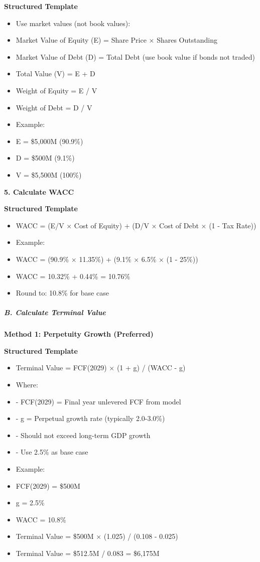 \documentclass[11pt]{article}
\begin{document}
\textbf{Structured Template}
\begin{itemize}[leftmargin=*,itemsep=2pt,topsep=2pt]
\item {} Use market values (not book values):
\item {} Market Value of Equity (E) = Share Price × Shares Outstanding
\item {} Market Value of Debt (D) = Total Debt (use book value if bonds not traded)
\item {} Total Value (V) = E + D
\item {} Weight of Equity = E / V
\item {} Weight of Debt = D / V
\item {} Example:
\item {} E = \$5,000M (90.9\%)
\item {} D = \$500M (9.1\%)
\item {} V = \$5,500M (100\%)
\end{itemize}

\textbf{5. Calculate WACC}

\textbf{Structured Template}
\begin{itemize}[leftmargin=*,itemsep=2pt,topsep=2pt]
\item {} WACC = (E/V × Cost of Equity) + (D/V × Cost of Debt × (1 - Tax Rate))
\item {} Example:
\item {} WACC = (90.9\% × 11.35\%) + (9.1\% × 6.5\% × (1 - 25\%))
\item {} WACC = 10.32\% + 0.44\% = 10.76\%
\item {} Round to: 10.8\% for base case
\end{itemize}

\subparagraph{B. Calculate Terminal Value}\mbox{}\par

\textbf{Method 1: Perpetuity Growth (Preferred)}

\textbf{Structured Template}
\begin{itemize}[leftmargin=*,itemsep=2pt,topsep=2pt]
\item {} Terminal Value = FCF(2029) × (1 + g) / (WACC - g)
\item {} Where:
\item {} - FCF(2029) = Final year unlevered FCF from model
\item {} - g = Perpetual growth rate (typically 2.0-3.0\%)
\item {} - Should not exceed long-term GDP growth
\item {} - Use 2.5\% as base case
\item {} Example:
\item {} FCF(2029) = \$500M
\item {} g = 2.5\%
\item {} WACC = 10.8\%
\item {} Terminal Value = \$500M × (1.025) / (0.108 - 0.025)
\item {} Terminal Value = \$512.5M / 0.083 = \$6,175M
\end{itemize}
\end{document}
